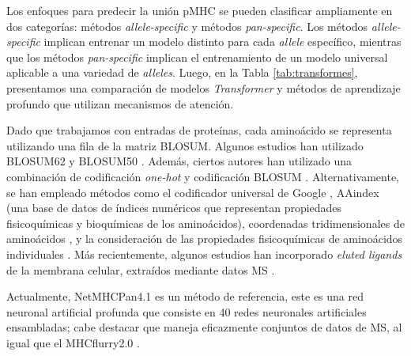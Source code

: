 Los enfoques para predecir la unión pMHC se pueden clasificar ampliamente en dos categorías: métodos \textit{allele-specific} y métodos \textit{pan-specific}. Los métodos \textit{allele-specific} implican entrenar un modelo distinto para cada \textit{allele} específico, mientras que los métodos \textit{pan-specific} implican el entrenamiento de un modelo universal aplicable a una variedad de \textit{alleles}. Luego, en la Tabla \ref{tab:transformes}, presentamos una comparación de modelos \textit{Transformer} y métodos de aprendizaje profundo que utilizan mecanismos de atención.

Dado que trabajamos con entradas de proteínas, cada aminoácido se representa utilizando una fila de la matriz BLOSUM. Algunos estudios han utilizado BLOSUM62 \citep{jin2021deep, ye2021mathla, zhao2019peptide, o2018mhcflurry} y BLOSUM50 \citep{yang2021deepnetbim, hu2019acme}. Además, ciertos autores han utilizado una combinación de codificación \textit{one-hot} y codificación BLOSUM \citep{liu2021deepseqpanii, jokinen2021predicting, zeng2019quantification, zeng2019deepligand}. Alternativamente, se han empleado métodos como el codificador universal de Google \citep{kubick2021predicting}, AAindex \citep{kawashima2000aaindex, li2021deepimmuno} (una base de datos de índices numéricos que representan propiedades fisicoquímicas y bioquímicas de los aminoácidos), coordenadas tridimensionales de aminoácidos \citep{shi2020deepantigen}, y la consideración de las propiedades fisicoquímicas de aminoácidos individuales \citep{moris2021current, montemurro2021nettcr, luu2021predicting}. Más recientemente, algunos estudios han incorporado \textit{eluted ligands} de la membrana celular, extraídos mediante datos MS \citep{zhouprioritizing, reynisson2020netmhcpan, reynisson2020improved, o2020mhcflurry, alvarez2019nnalign_ma}.

Actualmente, NetMHCPan4.1 \citep{reynisson2020netmhcpan} es un método de referencia, este es una red neuronal artificial profunda  que consiste en 40 redes neuronales artificiales ensambladas; cabe destacar que maneja eficazmente conjuntos de datos de MS, al igual que el MHCflurry2.0 \citep{o2020mhcflurry}.

